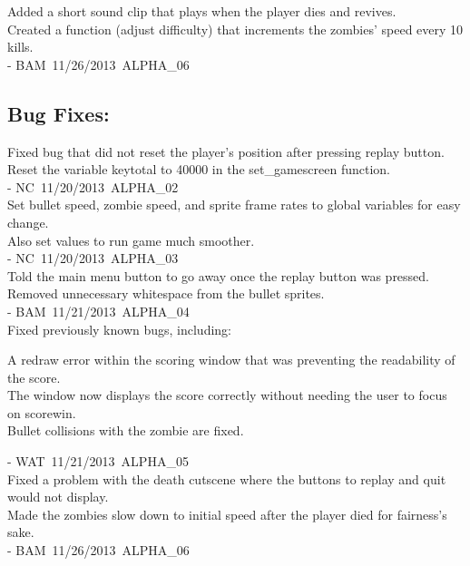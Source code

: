 \documentclass[12pt]{article}
\begin{document}
   \noindent
   Added a short sound clip that plays when the player dies and revives. \\
   	Created a function (adjust difficulty) that increments the zombies' speed every 10 kills. \\
   	- BAM\, 11/26/2013\, ALPHA\_06
   
   \subsection{Bug Fixes:}
   
   Fixed bug that did not reset the player's position after pressing replay button. \\
   	Reset the variable keytotal to 40000 in the set\_gamescreen function. \\
   	- NC\, 11/20/2013\, ALPHA\_02 \\
   
   \noindent	
   Set bullet speed, zombie speed, and sprite frame rates to global variables for easy change. \\
   	Also set values to run game much smoother. \\ 
   	- NC\, 11/20/2013\, ALPHA\_03 \\
   
   \noindent
   Told the main menu button to go away once the replay button was pressed. \\
   	Removed unnecessary whitespace from the bullet sprites. \\
   	- BAM\, 11/21/2013\, ALPHA\_04 \\
   
   \noindent	
   Fixed previously known bugs, including:
   	\begin{itemize}
   	A redraw error within the scoring window that was preventing the readability of the score. \\
   	The window now displays the score correctly without needing the user to focus on scorewin. \\
   	Bullet collisions with the zombie are fixed. \\
   	\end{itemize}
   	- WAT\, 11/21/2013\, ALPHA\_05 \\
   
   \noindent
   Fixed a problem with the death cutscene where the buttons to replay and quit would not display. \\
   	Made the zombies slow down to initial speed after the player died for fairness's sake. \\
   	- BAM\, 11/26/2013\, ALPHA\_06 \\
   
\end{document}
